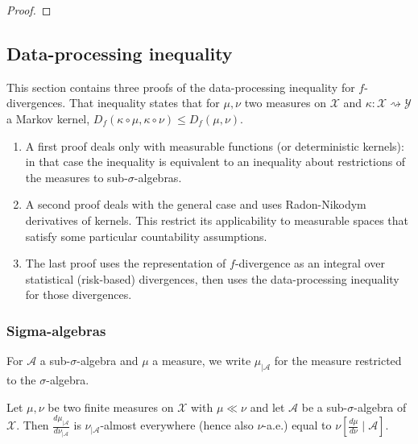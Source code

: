 \begin{proof}%
{}

\end{proof}




\subsection{Data-processing inequality}

This section contains three proofs of the data-processing inequality for $f$-divergences.
That inequality states that for $\mu, \nu$ two measures on $\mathcal X$ and $\kappa : \mathcal X \rightsquigarrow \mathcal Y$ a Markov kernel, $D_f(\kappa \circ \mu, \kappa \circ \nu) \le D_f(\mu, \nu)$.
\begin{enumerate}
  \item A first proof deals only with measurable functions (or deterministic kernels): in that case the inequality is equivalent to an inequality about restrictions of the measures to sub-$\sigma$-algebras.
  \item A second proof deals with the general case and uses Radon-Nikodym derivatives of kernels. This restrict its applicability to measurable spaces that satisfy some particular countability assumptions.
  \item The last proof uses the representation of $f$-divergence as an integral over statistical (risk-based) divergences, then uses the data-processing inequality for those divergences.
\end{enumerate}



\subsubsection{Sigma-algebras}

For $\mathcal A$ a sub-$\sigma$-algebra and $\mu$ a measure, we write $\mathcal \mu_{| \mathcal A}$ for the measure restricted to the $\sigma$-algebra.

\begin{lemma}
  \label{lem:rnDeriv_trim_of_ac}
  \leanok
  Let $\mu, \nu$ be two finite measures on $\mathcal X$ with $\mu \ll \nu$ and let $\mathcal A$ be a sub-$\sigma$-algebra of $\mathcal X$.
  Then $\frac{d \mu_{| \mathcal A}}{d \nu_{| \mathcal A}}$ is $\nu_{| \mathcal A}$-almost everywhere (hence also $\nu$-a.e.) equal to $\nu\left[ \frac{d \mu}{d \nu} \mid \mathcal A\right]$.
\end{lemma}

